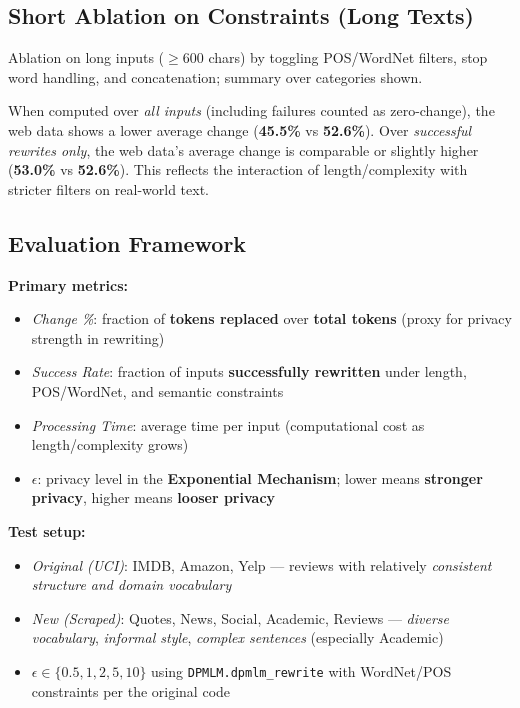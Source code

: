 \documentclass[11pt]{article}
\begin{document}
\subsection{Short Ablation on Constraints (Long Texts)}
\noindent Ablation on long inputs ($\geq$600 chars) by toggling POS/WordNet filters, stop word handling, and concatenation; summary over categories shown.\

When computed over \textit{all inputs} (including failures counted as zero-change), the web data shows a lower average change (\textbf{45.5\%} vs \textbf{52.6\%}). Over \textit{successful rewrites only}, the web data’s average change is comparable or slightly higher (\textbf{53.0\%} vs \textbf{52.6\%}). This reflects the interaction of length/complexity with stricter filters on real-world text.


\subsection{Evaluation Framework}
\textbf{Primary metrics:}
\begin{itemize}[leftmargin=*]
  \item \textit{Change \%}: fraction of \textbf{tokens replaced} over \textbf{total tokens} (proxy for privacy strength in rewriting)
  \item \textit{Success Rate}: fraction of inputs \textbf{successfully rewritten} under length, POS/WordNet, and semantic constraints
  \item \textit{Processing Time}: average time per input (computational cost as length/complexity grows)
  \item \textit{$\epsilon$}: privacy level in the \textbf{Exponential Mechanism}; lower means \textbf{stronger privacy}, higher means \textbf{looser privacy}
\end{itemize}

\textbf{Test setup:}
\begin{itemize}[leftmargin=*]
  \item \textit{Original (UCI)}: IMDB, Amazon, Yelp — reviews with relatively \textit{consistent structure and domain vocabulary}
  \item \textit{New (Scraped)}: Quotes, News, Social, Academic, Reviews — \textit{diverse vocabulary}, \textit{informal style}, \textit{complex sentences} (especially Academic)
  \item $\epsilon \in \{0.5, 1, 2, 5, 10\}$ using \texttt{DPMLM.dpmlm\_rewrite} with WordNet/POS constraints per the original code
\end{itemize}
\end{document}
